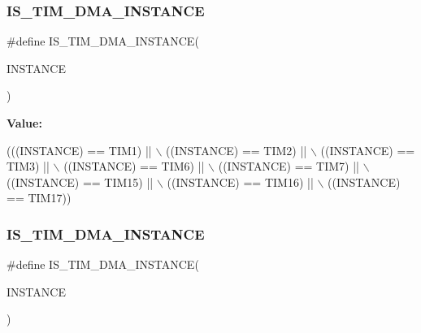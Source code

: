 \subsubsection{\texorpdfstring{I\+S\+\_\+\+T\+I\+M\+\_\+\+D\+M\+A\+\_\+\+I\+N\+S\+T\+A\+N\+CE}{IS\_TIM\_DMA\_INSTANCE}\hspace{0.1cm}{\footnotesize\ttfamily [15/16]}}
{\footnotesize\ttfamily \#define I\+S\+\_\+\+T\+I\+M\+\_\+\+D\+M\+A\+\_\+\+I\+N\+S\+T\+A\+N\+CE(\begin{DoxyParamCaption}\item[{}]{I\+N\+S\+T\+A\+N\+CE }\end{DoxyParamCaption})}

{\bfseries Value\+:}
\begin{DoxyCode}
(((INSTANCE) == TIM1)    || \(\backslash\)
   ((INSTANCE) == TIM2)    || \(\backslash\)
   ((INSTANCE) == TIM3)    || \(\backslash\)
   ((INSTANCE) == TIM6)    || \(\backslash\)
   ((INSTANCE) == TIM7)    || \(\backslash\)
   ((INSTANCE) == TIM15)   || \(\backslash\)
   ((INSTANCE) == TIM16)   || \(\backslash\)
   ((INSTANCE) == TIM17))
\end{DoxyCode}
\mbox{\label{group___exported__macro_gad51d77b3bcc12a3a5c308d727b561371}} 
\subsubsection{\texorpdfstring{I\+S\+\_\+\+T\+I\+M\+\_\+\+D\+M\+A\+\_\+\+I\+N\+S\+T\+A\+N\+CE}{IS\_TIM\_DMA\_INSTANCE}\hspace{0.1cm}{\footnotesize\ttfamily [16/16]}}
{\footnotesize\ttfamily \#define I\+S\+\_\+\+T\+I\+M\+\_\+\+D\+M\+A\+\_\+\+I\+N\+S\+T\+A\+N\+CE(\begin{DoxyParamCaption}\item[{}]{I\+N\+S\+T\+A\+N\+CE }\end{DoxyParamCaption})}

